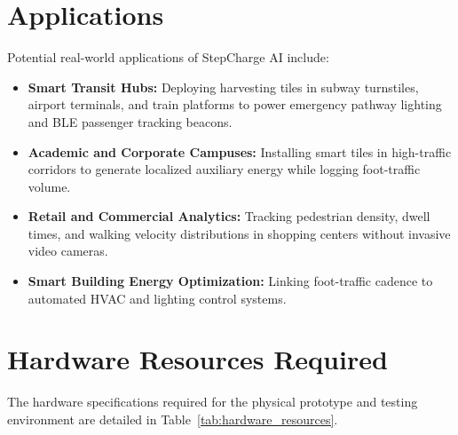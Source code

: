 \section{Applications}
Potential real-world applications of StepCharge AI include:
\begin{itemize}
    \item \textbf{Smart Transit Hubs:} Deploying harvesting tiles in subway turnstiles, airport terminals, and train platforms to power emergency pathway lighting and BLE passenger tracking beacons.
    \item \textbf{Academic and Corporate Campuses:} Installing smart tiles in high-traffic corridors to generate localized auxiliary energy while logging foot-traffic volume.
    \item \textbf{Retail and Commercial Analytics:} Tracking pedestrian density, dwell times, and walking velocity distributions in shopping centers without invasive video cameras.
    \item \textbf{Smart Building Energy Optimization:} Linking foot-traffic cadence to automated HVAC and lighting control systems.
\end{itemize}

\section{Hardware Resources Required}
The hardware specifications required for the physical prototype and testing environment are detailed in Table~\ref{tab:hardware_resources}.

